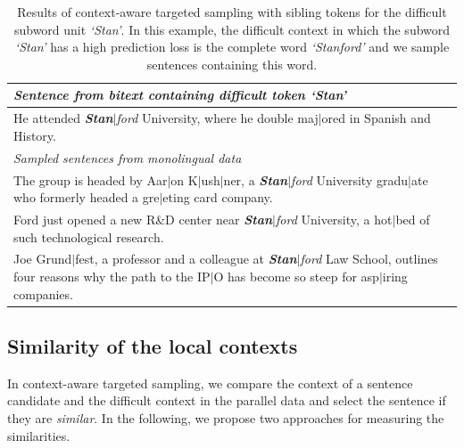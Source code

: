 \begin{table}[htb!]
\begin{center}\small
\caption{\label{exbpe2} Results of context-aware targeted sampling with sibling tokens for the difficult subword unit \textit{`Stan'}. In this example, the difficult context in which the subword \textit{`Stan'} has a high prediction loss is the complete word \textit{`Stanford'} and we sample sentences containing this word.}
\begin{tabularx}{0.8\columnwidth}{Xr}
\toprule
 \textit{Sentence from bitext containing difficult token \textbf{`Stan'}} & \\ \midrule
\multicolumn{2}{X}{He attended \textit{\textbf{Stan}$\mid$ford} University, where he double maj$\mid$ored in Spanish and History.}  \\  
  \midrule
  \textit{Sampled sentences from monolingual data} & \\%
  \midrule
  \rowcolor{tablegray}  The group is headed by Aar$\mid$on K$\mid$ush$\mid$ner, a \textit{\textbf{Stan}$\mid$ford} University gradu$\mid$ate who formerly headed a gre$\mid$eting card company. & \\%
   Ford just opened a new R\&D center near \textit{\textbf{Stan}$\mid$ford} University, a hot$\mid$bed of such technological research. & \\%
   \rowcolor{tablegray} Joe Grund$\mid$fest, a professor and a colleague at \textit{\textbf{Stan}$\mid$ford} Law School, outlines four reasons why the path to the IP$\mid$O has become so steep for asp$\mid$iring companies. & \\%
\bottomrule
\end{tabularx}
\end{center}
\end{table}

\subsection{Similarity of the local contexts}

In context-aware targeted sampling, we compare the context of a sentence candidate and the difficult context in the parallel data and select the sentence if they are \textit{similar}.
In the following, we propose two approaches for measuring the similarities. 

